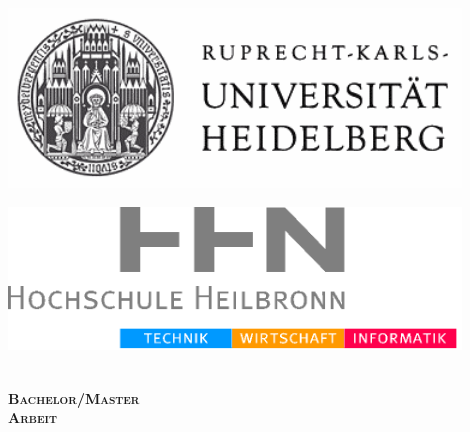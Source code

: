 
\begin{center}
\hfill
\begin{minipage}{0.45\textwidth}
\begin{flushleft}
\includegraphics[width=0.9\textwidth]{00_title/pics/UniHD} \\
\end{flushleft}
\end{minipage}
\hfill
\begin{minipage}{0.45\textwidth}
\begin{flushright}
\includegraphics[width=0.9\textwidth]{00_title/pics/HHN} \\
\end{flushright}
\end{minipage}
\hfill \\[3.0cm]

\textsc{\huge \bfseries Bachelor/Master}\\[1.0cm]
\textsc{\huge \bfseries Arbeit}\\[3.0cm]

{ \Large \bfseries \titel}\\[5.5cm]


\end{center}
